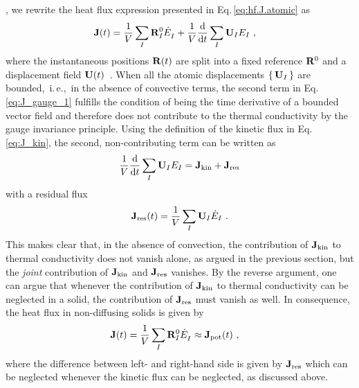, we rewrite the heat flux expression presented in Eq.\,\eqref{eq:hf.J.atomic} as
\begin{align}
	\b J (t) 
	&= \frac{1}{V} \sum_I \b R_I^0 \fD{\dot{E}}_I + { \frac{1}{V} \frac{\d}{\d t} \sum_I \b U_I E_I}~,
	\label{eq:J_gauge_1}
\end{align}
where the instantaneous positions ${\bf R} (t)$ are split into a fixed reference ${\bf R}^0$ and a displacement field ${\bf U} (t)$~\cite{Isaeva2019}. When all the atomic displacements $\set{{\bf U}_I}$ are bounded,~i.\,e.,~in the absence of convective terms, the second term in Eq.\,\eqref{eq:J_gauge_1} fulfills the condition of being the time derivative of a bounded vector field and therefore does not contribute to the thermal conductivity by the gauge invariance principle. Using the definition of the kinetic flux in Eq.\,\eqref{eq:J_kin}, the second, non-contributing term can be written as
\begin{align}
	\frac{1}{V} \frac{\d}{\d t} \sum_I \b U_I E_I
		= {\bf J}_{\rm kin} + {\bf J}_{\rm res}
	\label{eq:J_gauge_2}
\end{align}
with a residual flux %
\begin{align}
	{\bf J}_{\rm res} (t)
		= \frac{1}{V} \sum_I \b U_I \dot E_I~.
	\label{eq:J_gauge_3}
\end{align}
This makes clear that, in the absence of convection, the contribution of ${\bf J}_{\rm kin}$ to thermal conductivity does not vanish alone, as argued in the previous section, but the \emph{joint} contribution of ${\bf J}_{\rm kin}$ and ${\bf J}_{\rm res}$ vanishes. By the reverse argument, one can argue that whenever the contribution of ${\bf J}_{\rm kin}$ to thermal conductivity can be neglected in a solid, the contribution of ${\bf J}_{\rm res}$ must vanish as well. In consequence, the heat flux in non-diffusing solids is given by
\begin{align}
	\b J (t) 
		&= \frac{1}{V} \sum_I \b R_I^0 \fD{\dot{E}}_I
		\approx {\bf J}_{\rm pot} (t)~,
	\label{eq:J_tot_solid}
\end{align}
where the difference between left- and right-hand side is given by ${\bf J}_{\rm res}$ which can be neglected whenever the kinetic flux can be neglected, as discussed above.


